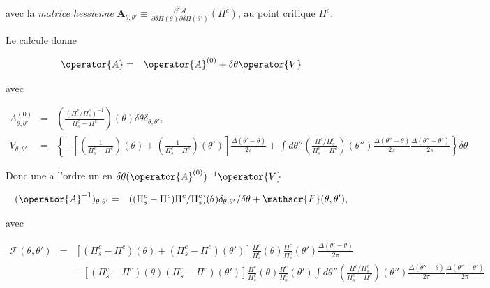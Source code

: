 avec la {\em matrice hessienne} $\mathbf{A}_{\theta , \theta'} \equiv \frac{\partial^2 \mathcal{A}}{\partial \delta \Pi(\theta) \partial \delta \Pi(\theta') }(\Pi^c)$, au point critique $\Pi^c$.

Le calcule donne

\begin{eqnarray*}
	\operator{A} & = & \operator{A}^{(0)} + \delta \theta \operator{V}
\end{eqnarray*}

avec 

\begin{eqnarray*}
	A^{(0)}_{\theta , \theta'}  & = &  \left ( \frac{ ( \Pi^c/\Pi^c_s)^{-1}}{\Pi^c_s - \Pi^c} \right )(\theta) \delta \theta   \delta_{\theta,\theta '}	,\\
	V_{\theta , \theta'}  &= & \left \{ - \left [ \left ( \frac{1}{\Pi^c_s - \Pi^c } \right ) ( \theta)  + \left ( \frac{1}{\Pi^c_s - \Pi^c } \right ) ( \theta' )\right ] \frac{ \Delta( \theta'- \theta )}{ 2 \pi } + \int d\theta'' \left (   \frac{ \Pi^c/\Pi^c_s}{\Pi^c_s - \Pi^c} \right )(\theta'') \frac{\Delta(\theta''- \theta)}{2 \pi}\frac{\Delta(\theta''- \theta')}{2 \pi}   \right \} \delta \theta	
\end{eqnarray*}

\begin{aff}
Donc une a l'ordre un en $\delta \theta (\operator{A}^{(0)})^{-1} \operator{V}$ 

\begin{eqnarray*}
	(\operator{A}^{-1})_{\theta,\theta'} & = &  ( (\Pi^c_s - \Pi^c)\Pi^c/\Pi^c_s ) ( \theta ) \delta_{\theta, \theta'}/\delta \theta + \mathscr{F}(\theta , \theta' ) ,	
\end{eqnarray*}

avec 

\begin{eqnarray*}
	\mathscr{F}(\theta , \theta' ) & = & \left [ (\Pi^c_s - \Pi^c )( \theta)  +  (\Pi^c_s - \Pi^c ) ( \theta' )\right ] \frac{\Pi^c}{\Pi^c_s}(\theta)\frac{\Pi^c}{\Pi^c_s}(\theta') \frac{ \Delta( \theta'- \theta )}{ 2 \pi }\\
	&&  - \left [ (\Pi^c_s - \Pi^c )( \theta)   (\Pi^c_s - \Pi^c ) ( \theta' )\right ] \frac{\Pi^c}{\Pi^c_s}(\theta)\frac{\Pi^c}{\Pi^c_s}(\theta')\int d\theta'' \left (   \frac{ \Pi^c/\Pi^c_s}{\Pi^c_s - \Pi^c} \right )(\theta'') \frac{\Delta(\theta''- \theta)}{2 \pi}\frac{\Delta(\theta''- \theta')}{2 \pi}  	
\end{eqnarray*}
\end{aff}


